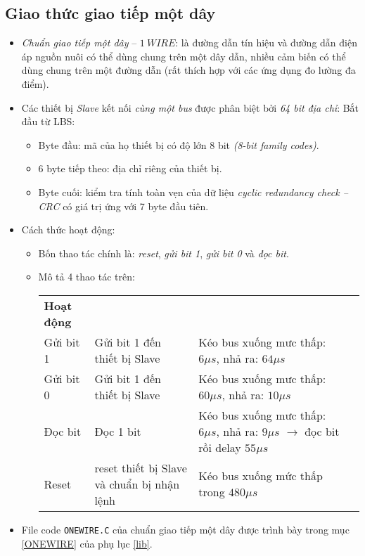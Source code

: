 \subsection{Giao thức giao tiếp một dây}
\begin{itemize}
\item \textit{Chuẩn giao tiếp một dây} -- $1 ~ WIRE$: là đường dẫn tín hiệu và đường dẫn điện áp nguồn nuôi có thể dùng chung trên một dây dẫn, nhiều cảm biến có thể dùng chung trên một đường dẫn (rất thích hợp với các ứng dụng đo lường đa điểm).
\item Các thiết bị \textit{Slave} kết nối \textit{cùng một bus} được phân biệt bởi \textit{64 bit địa chỉ}: Bắt đầu từ LBS:
\begin{itemize}
\item Byte đầu: mã của họ thiết bị có độ lớn 8 bit \textit{(8-bit family codes)}.
\item 6 byte tiếp theo: địa chỉ riêng của thiết bị.
\item Byte cuối: kiểm tra tính toàn vẹn của dữ liệu \textit{cyclic redundancy check -- CRC} có giá trị ứng với 7 byte đầu tiên.
\end{itemize}
\item Cách thức hoạt động:
\begin{itemize}
\item Bốn thao tác chính là: \textit{reset}, \textit{gửi bit 1}, \textit{gửi bit 0} và \textit{đọc bit}.
\item Mô tả 4 thao tác trên:
\begin{table}[h]
\begin{center}
\begin{tabular}{|l|p{4cm}|p{5cm}|l}\cline{1-3}
\textbf{Hoạt động} & \centering{\textbf{Mô tả}} & \centering{\textbf{Thực thi}} & \\ \cline{1-3}
Gửi bit 1 & Gửi bit 1 đến thiết bị Slave & Kéo bus xuống mưc thấp: $6\mu s$, nhả ra: $64 \mu s$ & \\ \cline{1-3}
Gửi bit 0 & Gửi bit 1 đến thiết bị Slave & Kéo bus xuống mưc thấp: $60\mu s$, nhả ra: $10 \mu s$ & \\ \cline{1-3}
Đọc bit & Đọc 1 bit & Kéo bus xuống mưc thấp: $6\mu s$, nhả ra: $9 \mu s$ $\longrightarrow$ đọc bit rồi delay $55\mu s$ & \\ \cline{1-3}
Reset & reset thiết bị Slave và chuẩn bị nhận lệnh & Kéo bus xuống mức thấp trong $480\mu s$ & \\ \cline{1-3}
\end{tabular}
\end{center}
\end{table}
\end{itemize}
\item File code \verb|ONEWIRE.C| của chuẩn giao tiếp một dây được trình bày trong mục \ref{ONEWIRE} của phụ lục \ref{lib}.
\end{itemize}
